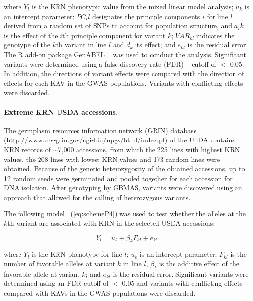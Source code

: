 \documentclass[10pt,letterpaper]{article}
\providecommand{\DIFaddtex}[1]{{\protect\color{blue}\uwave{#1}}} %
\providecommand{\DIFdeltex}[1]{{\protect\color{red}\sout{#1}}}                      %
\providecommand{\DIFaddbegin}{} %
\providecommand{\DIFaddend}{} %
\providecommand{\DIFdelbegin}{} %
\providecommand{\DIFdelend}{} %
\providecommand{\DIFadd}[1]{\texorpdfstring{\DIFaddtex{#1}}{#1}} %
\providecommand{\DIFdel}[1]{\texorpdfstring{\DIFdeltex{#1}}{}} %
\begin{document}
where $Y_l$ is the KRN phenotypic value from the mixed linear model analysis; $u_k$ is an intercept parameter; \DIFdelbegin \DIFdel{$PC_il$ }\DIFdelend \DIFaddbegin \DIFadd{$PC_{il}$ }\DIFaddend designates the principle components $i$ for line $l$ derived from a random set of SNPs to account for population structure, and \DIFdelbegin \DIFdel{$a_ik$ }\DIFdelend \DIFaddbegin \DIFadd{$a_{ik}$ }\DIFaddend is the effect of the $i$th principle component for variant $k$; $VAR_{kl}$ indicates the genotype of the $k$th variant in line $l$ and $d_k$ its effect; and $e_{kl}$ is the residual error. The R add-on package GenABEL ~\cite{Aulchenko2007} was used to conduct the analysis. Significant variants were determined using a false discovery rate (FDR) ~\cite{Benjamini1995} cutoff of $<$ 0.05. In addition, the directions of variant effects were compared with the direction of effects for each KAV in the GWAS populations. Variants with conflicting effects were discarded. 

\paragraph{Extreme KRN USDA accessions.}
The germplasm resources information network (GRIN) database (\url{http://www.ars-grin.gov/cgi-bin/npgs/html/index.pl}) of the USDA contains KRN records of $\sim$7,000 accessions, from which the 225 lines with highest KRN values, the 208 lines with lowest KRN values and 173 random lines were obtained. Because of the genetic heterozygosity of the obtained accessions, up to 12 random seeds were germinated and pooled together for each accession for DNA isolation. After genotyping by GBMAS, variants were discovered using an approach that allowed for the calling of heterozygous variants.

The following model ~(\ref{eq:schemeP4}) was used to test whether the alleles at the $k$th variant are associated with KRN in the selected USDA accessions:

\begin{equation}\label{eq:schemeP4} 
Y_l = u_k + \beta_k F_{kl} + e_{kl}
\end{equation}

where $Y_l$ is the KRN phenotype for line $l$; $u_k$ is an intercept parameter; $F_{kl}$ is the number of favorable alleles at variant $k$ in line $l$, $\beta_k$ is the additive effect of the favorable allele at variant $k$; and $e_{kl}$ is the residual error. Significant variants were determined using an FDR cutoff of $<$ 0.05 and variants with conflicting effects compared with KAVs in the GWAS populations were discarded.
%
\end{document}
